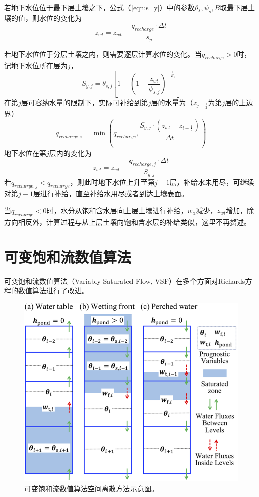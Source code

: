 若地下水位位于最下层土壤之下，公式（\ref{eqn:s_y}）中的参数$\theta_s,\psi_s,B$取最下层土壤的值，则水位的变化为
\begin{equation}
z_{w t}=z_{w t}-\frac{q_{recharge} \cdot \Delta t}{s_{y}}
\end{equation}

若地下水位位于分层土壤之内，则需要逐层计算水位的变化。当$q_{recharge}>0$时，记地下水位所在层为$j$，
\begin{equation}
{S}_{y,j}=\theta_{s,j}\left[1-\left(1-\frac{z_{wt}}{\psi_{s,j}}\right)^{-\frac{1}{B_j}}\right]
\end{equation}
在第$j$层可容纳水量的限制下，实际可补给到第$j$层的水量为（$z_{j-\frac{1}{2}}$为第$j$层的上边界）
\begin{equation}
q_{recharge, i}=\min \left(q_{recharge}, \frac{S_{y,j} \cdot \left(z_{w t}-z_{i-\frac{1}{2}}\right)}{\Delta t} \right)  
\end{equation}
地下水位在第$j$层内的变化为
\begin{equation}
z_{w t}=z_{w t}-\frac{q_{recharge,j} \cdot \Delta t}{S_{y,j}}
\end{equation}
若$q_{recharge,j}<q_{recharge}$，则此时地下水位上升至第$j-1$层，补给水未用尽，可继续对第$j-1$层进行补给，直至补给水用尽或者到达土壤表面。

当$q_{recharge}<0$时，水分从饱和含水层向上层土壤进行补给，$w_a$减少，$z_{wt}$增加，除方向相反外，计算过程与从上层土壤向饱和含水层的补给类似，这里不再赘述。

\section{可变饱和流数值算法}

可变饱和流数值算法（Variably Saturated Flow, VSF）\citep{dai2019vsf}在多个方面对Richards方程的数值算法进行了改进。

{
\begin{figure}[htbp]
\centering
\includegraphics{Figures/陆地表面的水分循环/可变饱和流数值算法预报区域空间结构示意图.png}
\caption{可变饱和流数值算法空间离散方法示意图。}
\label{fig:可变饱和流数值算法预报区域空间结构示意图}
\end{figure}
}

